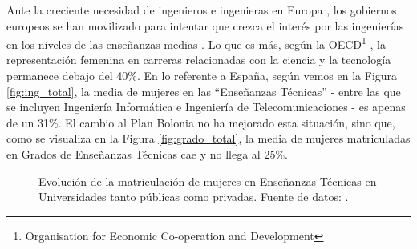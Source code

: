\documentclass[runningheads,a4paper]{llncs}
\begin{document}
Ante la creciente necesidad de ingenieros e ingenieras en Europa \cite{gago2004europe}, los gobiernos europeos se han movilizado para intentar que crezca el interés por las ingenierías en los niveles de las enseñanzas medias \cite{Kearney2014}. Lo que es más, según la OECD\footnote{Organisation for Economic Co-operation and Development} \cite{OECD2006}, la representación femenina en carreras relacionadas con la ciencia y la tecnología permanece debajo del 40\%. En lo referente a España, según vemos en la Figura \ref{fig:ing_total}, la media de mujeres en las ``Enseñanzas Técnicas'' - entre las que se incluyen Ingeniería Informática e Ingeniería de Telecomunicaciones - es apenas de un 31\%. El cambio al Plan Bolonia \cite{fernandez2009plan} no ha mejorado esta situación, sino que, como se visualiza en la Figura \ref{fig:grado_total}, la media de mujeres matriculadas en Grados de Enseñanzas Técnicas cae y no llega al 25\%.

\begin{figure}[ht]
        \centering
        \caption{{\footnotesize Evolución de la matriculación de mujeres en Enseñanzas Técnicas en Universidades tanto públicas como privadas. Fuente de datos: \cite{datos::uni}.}}\label{fig:datos_total}
\end{figure}
\end{document}
